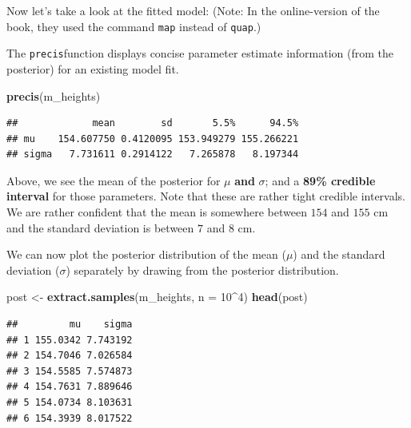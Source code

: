 \documentclass[
]{book}
\newenvironment{Shaded}{\begin{snugshade}}{\end{snugshade}}
\newcommand{\AttributeTok}[1]{\textcolor[rgb]{0.13,0.29,0.53}{#1}}
\newcommand{\DecValTok}[1]{\textcolor[rgb]{0.00,0.00,0.81}{#1}}
\newcommand{\FunctionTok}[1]{\textcolor[rgb]{0.13,0.29,0.53}{\textbf{#1}}}
\newcommand{\NormalTok}[1]{#1}
\newcommand{\OtherTok}[1]{\textcolor[rgb]{0.56,0.35,0.01}{#1}}
\newcommand{\SpecialCharTok}[1]{\textcolor[rgb]{0.81,0.36,0.00}{\textbf{#1}}}
\begin{document}
Now let's take a look at the fitted model:
(Note: In the online-version of the book, they used the command \texttt{map} instead of \texttt{quap}.)

The \texttt{precis}function displays concise parameter estimate information
(from the posterior) for an existing model fit.

\begin{Shaded}
\begin{Highlighting}[]
\FunctionTok{precis}\NormalTok{(m\_heights)}
\end{Highlighting}
\end{Shaded}

\begin{verbatim}
##             mean        sd       5.5%      94.5%
## mu    154.607750 0.4120095 153.949279 155.266221
## sigma   7.731611 0.2914122   7.265878   8.197344
\end{verbatim}

Above, we see the mean of the posterior for \(\mu\) \textbf{and} \(\sigma\);
and a \textbf{89\% credible interval} for those parameters.
Note that these are rather tight credible intervals. We are rather confident that the mean is somewhere between
\(154\) and \(155\) cm and the standard deviation is between \(7\) and \(8\) cm.

We can now plot the posterior distribution of the mean (\(\mu\)) and the standard
deviation (\(\sigma\)) separately by drawing from the posterior distribution.

\begin{Shaded}
\begin{Highlighting}[]
\NormalTok{post }\OtherTok{\textless{}{-}} \FunctionTok{extract.samples}\NormalTok{(m\_heights, }\AttributeTok{n =} \DecValTok{10}\SpecialCharTok{\^{}}\DecValTok{4}\NormalTok{)}
\FunctionTok{head}\NormalTok{(post)}
\end{Highlighting}
\end{Shaded}

\begin{verbatim}
##         mu    sigma
## 1 155.0342 7.743192
## 2 154.7046 7.026584
## 3 154.5585 7.574873
## 4 154.7631 7.889646
## 5 154.0734 8.103631
## 6 154.3939 8.017522
\end{verbatim}

\begin{Shaded}
\end{Shaded}
\end{document}
